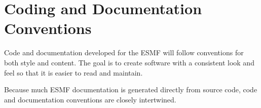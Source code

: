 
\section{Coding and Documentation Conventions}
\label{sec:code_conv}

Code and documentation developed for the ESMF will follow conventions 
for both style and content.  The goal is to create software with a consistent 
look and feel so that it is easier to read and maintain.  

Because much ESMF documentation is generated directly from source 
code, code and documentation conventions are closely intertwined.
























